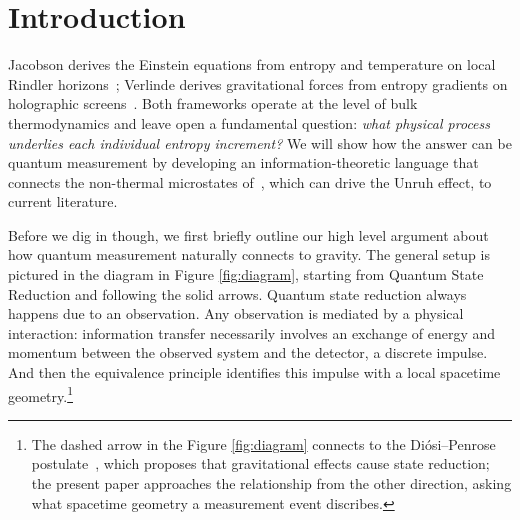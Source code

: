 \documentclass[12pt,a4paper]{article}
\begin{document}
\section{Introduction}

Jacobson derives the Einstein 
equations from entropy and temperature on local Rindler 
horizons~\cite{jacobson1995thermodynamics}; Verlinde derives 
gravitational forces from entropy gradients on holographic 
screens~\cite{entropic}. Both frameworks operate at the level 
of bulk thermodynamics and leave open a fundamental question: {\it what physical process underlies each individual entropy increment?}
We will show how the answer can be quantum measurement by developing an information-theoretic language that connects the non-thermal microstates of~\cite{player2025driving}, which can drive the Unruh effect, to current literature.

Before we dig in though, we first briefly outline our high level argument about how quantum measurement naturally connects to gravity. The general setup is pictured in the diagram in Figure \ref{fig:diagram}, starting from Quantum State Reduction and following the solid arrows. Quantum state reduction always happens due to an observation. Any observation is mediated by a physical interaction: information transfer necessarily involves an exchange of energy and momentum between the observed system and the detector, a discrete impulse. And then the equivalence principle identifies this impulse 
with a local spacetime geometry.\footnote{The dashed arrow in the
  Figure \ref{fig:diagram} connects
  to the Di\'{o}si--Penrose postulate~\cite{diosi1987universal,penrose1996gravity}, which proposes that 
gravitational effects cause state reduction; the present 
paper approaches the relationship from the other direction, 
asking what spacetime geometry a measurement event discribes.}
\end{document}
